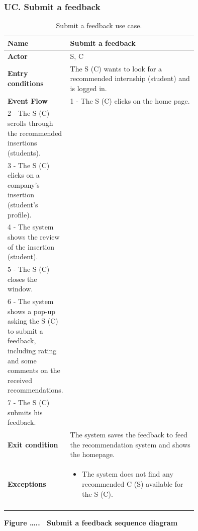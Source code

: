 \subsubsection*{UC\cuc . Submit a feedback}
\begin{center}
    \begin{longtable}{|l|p{0.75\linewidth}|}
        \hline
        \textbf{Name}               & Submit a feedback\\
        \hline
        \textbf{Actor}              & S, C\\
        \hline
        \textbf{Entry conditions}   & The S (C) wants to look for a recommended internship (student) and is logged in.\\
        \hline
        \textbf{Event Flow}         & 
        1 - The S (C) clicks on the home page. \\
        2 - The S (C) scrolls through the recommended insertions (students). \\
        3 - The S (C) clicks on a company’s insertion (student’s profile). \\
        4 - The system shows the review of the insertion (student). \\
        5 - The S (C) closes the window. \\
        6 - The system shows a pop-up asking the S (C) to submit a feedback, including rating and some comments on the received recommendations. \\
        7 - The S (C) submits his feedback. \\
        \hline
        \textbf{Exit condition}   & The system saves the feedback to feed the recommendation system and shows the homepage. \\       
        \hline
        \textbf{Exceptions}       & \begin{itemize}
            \item The system does not find any recommended C (S) available for the S (C).
        \end{itemize}\\
        \hline
        \caption{Submit a feedback use case.}
        \label{tab: submit_feedback_use_case}
    \end{longtable}
\end{center}


\textbf{Figure \ldots..~ Submit a feedback sequence diagram}

